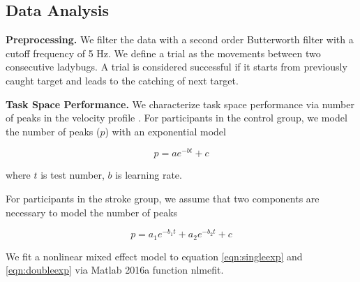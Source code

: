 \subsection{Data Analysis}

\textbf{Preprocessing.}
We filter the data with a second order Butterworth filter with a cutoff frequency of 5 Hz.
We define a trial as the movements between two consecutive ladybugs.
A trial is considered successful if it starts from previously caught target and leads to the catching of next target.

\textbf{Task Space Performance.}
We characterize task space performance via number of peaks in the velocity profile \cite{}.
For participants in the control group, we model the number of peaks ($ p $) with an exponential model

\begin{equation}\label{eqn:singleexp}
p = a e^{-b t} + c
\end{equation}

where $ t $ is test number, $ b $ is learning rate.

For participants in the stroke group, we assume that two components are necessary to model the number of peaks

\begin{equation}\label{doubleexp}
p = a_1 e^{-b_1 t} + a_2 e^{-b_2 t} + c
\end{equation}

We fit a nonlinear mixed effect model to equation \ref{eqn:singleexp} and \ref{eqn:doubleexp} via Matlab 2016a function \textsf{nlmefit}.

